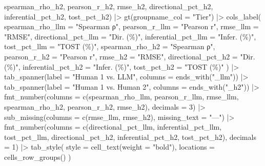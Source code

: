\documentclass[
  letterpaper,
  DIV=11,
  numbers=noendperiod]{scrartcl}
\newenvironment{Shaded}{\begin{snugshade}}{\end{snugshade}}
\newcommand{\AttributeTok}[1]{\textcolor[rgb]{0.40,0.45,0.13}{#1}}
\newcommand{\DecValTok}[1]{\textcolor[rgb]{0.68,0.00,0.00}{#1}}
\newcommand{\FunctionTok}[1]{\textcolor[rgb]{0.28,0.35,0.67}{#1}}
\newcommand{\NormalTok}[1]{\textcolor[rgb]{0.00,0.23,0.31}{#1}}
\newcommand{\SpecialCharTok}[1]{\textcolor[rgb]{0.37,0.37,0.37}{#1}}
\newcommand{\StringTok}[1]{\textcolor[rgb]{0.13,0.47,0.30}{#1}}
\begin{document}
\begin{Shaded}
\begin{Highlighting}[]
\NormalTok{         spearman\_rho\_h2, pearson\_r\_h2, rmse\_h2,}
\NormalTok{         directional\_pct\_h2, inferential\_pct\_h2, tost\_pct\_h2) }\SpecialCharTok{|\textgreater{}}
  \FunctionTok{gt}\NormalTok{(}\AttributeTok{groupname\_col =} \StringTok{"Tier"}\NormalTok{) }\SpecialCharTok{|\textgreater{}}
  \FunctionTok{cols\_label}\NormalTok{(}
    \AttributeTok{spearman\_rho\_llm    =} \StringTok{"Spearman ρ"}\NormalTok{, }\AttributeTok{pearson\_r\_llm    =} \StringTok{"Pearson r"}\NormalTok{, }\AttributeTok{rmse\_llm    =} \StringTok{"RMSE"}\NormalTok{,}
    \AttributeTok{directional\_pct\_llm =} \StringTok{"Dir. (\%)"}\NormalTok{,   }\AttributeTok{inferential\_pct\_llm =} \StringTok{"Infer. (\%)"}\NormalTok{, }\AttributeTok{tost\_pct\_llm =} \StringTok{"TOST (\%)"}\NormalTok{,}
    \AttributeTok{spearman\_rho\_h2     =} \StringTok{"Spearman ρ"}\NormalTok{, }\AttributeTok{pearson\_r\_h2     =} \StringTok{"Pearson r"}\NormalTok{, }\AttributeTok{rmse\_h2     =} \StringTok{"RMSE"}\NormalTok{,}
    \AttributeTok{directional\_pct\_h2  =} \StringTok{"Dir. (\%)"}\NormalTok{,   }\AttributeTok{inferential\_pct\_h2  =} \StringTok{"Infer. (\%)"}\NormalTok{, }\AttributeTok{tost\_pct\_h2  =} \StringTok{"TOST (\%)"}
\NormalTok{  ) }\SpecialCharTok{|\textgreater{}}
  \FunctionTok{tab\_spanner}\NormalTok{(}\AttributeTok{label =} \StringTok{"Human 1 vs. LLM"}\NormalTok{, }\AttributeTok{columns =} \FunctionTok{ends\_with}\NormalTok{(}\StringTok{"\_llm"}\NormalTok{)) }\SpecialCharTok{|\textgreater{}}
  \FunctionTok{tab\_spanner}\NormalTok{(}\AttributeTok{label =} \StringTok{"Human 1 vs. Human 2"}\NormalTok{, }\AttributeTok{columns =} \FunctionTok{ends\_with}\NormalTok{(}\StringTok{"\_h2"}\NormalTok{)) }\SpecialCharTok{|\textgreater{}}
  \FunctionTok{fmt\_number}\NormalTok{(}\AttributeTok{columns =} \FunctionTok{c}\NormalTok{(spearman\_rho\_llm, pearson\_r\_llm, rmse\_llm,}
\NormalTok{                          spearman\_rho\_h2,  pearson\_r\_h2,  rmse\_h2), }\AttributeTok{decimals =} \DecValTok{3}\NormalTok{) }\SpecialCharTok{|\textgreater{}}
  \FunctionTok{sub\_missing}\NormalTok{(}\AttributeTok{columns =} \FunctionTok{c}\NormalTok{(rmse\_llm, rmse\_h2), }\AttributeTok{missing\_text =} \StringTok{"—"}\NormalTok{) }\SpecialCharTok{|\textgreater{}}
  \FunctionTok{fmt\_number}\NormalTok{(}\AttributeTok{columns =} \FunctionTok{c}\NormalTok{(directional\_pct\_llm, inferential\_pct\_llm, tost\_pct\_llm,}
\NormalTok{                          directional\_pct\_h2,  inferential\_pct\_h2,  tost\_pct\_h2), }\AttributeTok{decimals =} \DecValTok{1}\NormalTok{) }\SpecialCharTok{|\textgreater{}}
  \FunctionTok{tab\_style}\NormalTok{(}
    \AttributeTok{style     =} \FunctionTok{cell\_text}\NormalTok{(}\AttributeTok{weight =} \StringTok{"bold"}\NormalTok{),}
    \AttributeTok{locations =} \FunctionTok{cells\_row\_groups}\NormalTok{()}
\NormalTok{  )}
\end{Highlighting}
\end{Shaded}
\end{document}
